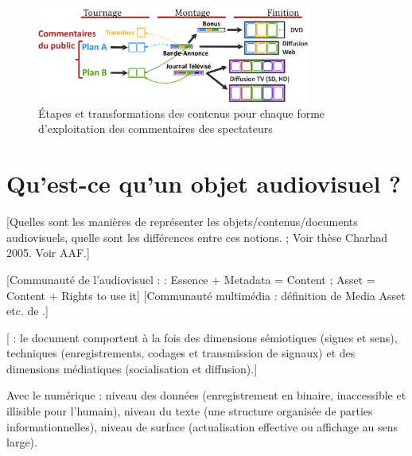 \begin{figure}[ht!]
\centering
\includegraphics[width=0.8\textwidth]{images/EX-Content-Production-v7fr.png}
\caption{Étapes et transformations des contenus pour chaque forme d'exploitation des commentaires des spectateurs}
\label{img:intro:reuse-process}
\end{figure}




\section{Qu'est-ce qu'un objet audiovisuel ?}\label{sec:dav}
[Quelles sont les manières de représenter les objets/contenus/documents audiovisuels, quelle sont les différences entre ces notions.
\cite{Morizet-mahoudeaux2005a} ;  Voir thèse Charhad 2005. Voir AAF.]

[Communauté de l'audiovisuel : \cite{Cox2006} : Essence + Metadata = Content ; \cite{Austerberry2004} Asset = Content + Rights to use it]
[Communauté multimédia : définition de Media Asset etc. de \cite{Furht2008}.]



[\cite{Leleu-merviela} : le document comportent à la fois des dimensions sémiotiques (signes et sens), techniques (enregistrements, codages et transmission de signaux) et des dimensions médiatiques (socialisation et diffusion).]

Avec le numérique : niveau des données (enregistrement en binaire, inaccessible et illisible pour l'humain), niveau du texte (une structure organisée de parties informationnelles), niveau de surface (actualisation effective ou affichage au sens large). 

